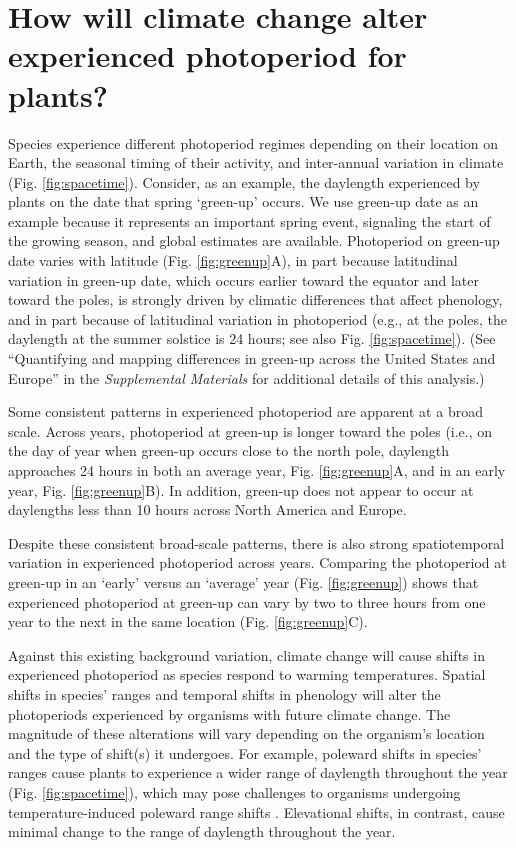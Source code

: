 \documentclass{article}
\begin{document}
\section*{How will climate change alter experienced photoperiod for plants?}
\par Species experience different photoperiod regimes depending on their location on Earth, the seasonal timing of their activity, and inter-annual variation in climate (Fig. \ref{fig:spacetime}). Consider, as an example, the daylength experienced by plants on the date that spring `green-up' occurs. We use green-up date as an example because it represents an important spring event, signaling the start of the growing season, and global estimates are available. Photoperiod on green-up date varies with latitude (Fig. \ref{fig:greenup}A), in part because latitudinal variation in green-up date, which occurs earlier toward the equator and later toward the poles, is strongly driven by climatic differences that affect phenology, and in part because of latitudinal variation in photoperiod (e.g., at the poles, the daylength at the summer solstice is 24 hours; see also Fig. \ref{fig:spacetime}). (See ``Quantifying and mapping differences in green-up across the United States and Europe'' in the \emph{Supplemental Materials} for additional details of this analysis.) 
\par Some consistent patterns in experienced photoperiod are apparent at a broad scale. Across years, photoperiod at green-up is longer toward the poles (i.e., on the day of year when green-up occurs close to the north pole, daylength approaches 24 hours in both an average year, Fig. \ref{fig:greenup}A, and in an early year, Fig. \ref{fig:greenup}B). In addition, green-up does not appear to occur at daylengths less than 10 hours across North America and Europe. 
\par Despite these consistent broad-scale patterns, there is also strong spatiotemporal variation in experienced photoperiod across years. Comparing the photoperiod at green-up in an `early' versus an `average' year (Fig. \ref{fig:greenup}) shows that experienced photoperiod at green-up can vary by two to three hours from one year to the next in the same location (Fig. \ref{fig:greenup}C).%

\par Against this existing background variation, climate change will cause shifts in experienced photoperiod as species respond to warming temperatures. Spatial shifts in species' ranges and temporal shifts in phenology will alter the photoperiods experienced by organisms with future climate change. The magnitude of these alterations will vary depending on the organism's location and the type of shift(s) it undergoes. For example, poleward shifts in species' ranges cause plants to experience a wider range of daylength throughout the year (Fig. \ref{fig:spacetime}), which may pose challenges to organisms undergoing temperature-induced poleward range shifts \citep{huffeldt2020}. Elevational shifts, in contrast, cause minimal change to the range of daylength throughout the year.
\end{document}
